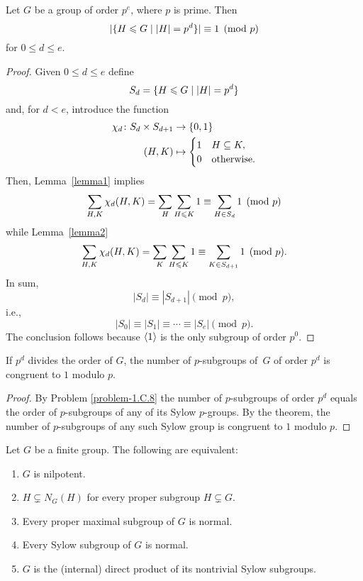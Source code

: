 \begin{thm}
    Let\/ $G$ be a group of order $p^e$, where $p$ is prime. Then
    $$
        |\{H\leqslant G\mid |H|=p^d\}|\equiv1\pmod{p}
    $$
    for\/ $0 \le d \le e$.
\end{thm}

\begin{proof} Given $0\le d\le e$ define
$$
    S_d=\{H \leqslant G\mid \left\vert{H}\right\vert=p^d\}
$$
and, for $d<e$, introduce the function
\begin{align*}
    \chi_d\colon S_d\times S_{d+1}&\to\{0,1\}\\
    (H,K)&\mapsto\begin{cases}
        1   &H\subseteq K,\\
        0   &\rm otherwise.
    \end{cases}
\end{align*}
Then, Lemma~\ref{lemma1} implies
$$
    \sum_{H,K}\chi_d(H,K) = \sum_H\sum_{H\leqslant K}1
        \equiv\sum_{H\in S_d}1\pmod p
$$
while Lemma~\ref{lemma2}
$$
    \sum_{H,K}\chi_d(H,K) = \sum_K\sum_{H\leqslant K}1
        \equiv\sum_{K\in S_{d+1}}1\pmod p.
$$
In sum,
$$
    |S_d|\equiv|S_{d+1}|\pmod p,
$$
i.e.,
$$
    |S_0|\equiv|S_1|\equiv\cdots\equiv|S_e|\pmod p.
$$
The conclusion follows because $\langle1\rangle$ is the only subgroup of order $p^0$.  \end{proof}

\begin{cor}\label{p-subgroups}
     If\/ $p^d$ divides the order of\/ $G$, the number of\/ $p$-subgroups of\/~$G$ of order\/ $p^d$ is congruent to\/ $1$ modulo\/ $p$.
\end{cor}

\begin{proof} By Problem \ref{problem-1.C.8} the number of $p$-subgroups of order $p^d$ equals the order of $p$-subgroups of any of its Sylow $p$-groups. By the theorem, the number of $p$-subgroups of any such Sylow group is congruent to $1$ modulo $p$.  \end{proof}

\begin{thm}\label{nilpotent-equivalences}
    Let\/ $G$ be a finite group. The following are equivalent:
    \begin{enumerate}[\rm a)]
        \item $G$ is nilpotent.
        \item $H\varsubsetneq N_G(H)$ for every proper subgroup $H\varsubsetneq G$.
        \item Every proper maximal subgroup of\/ $G$ is normal.
        \item Every Sylow subgroup of\/ $G$ is normal.
        \item $G$ is the (internal) direct product of its nontrivial Sylow subgroups.
    \end{enumerate}
\end{thm}

